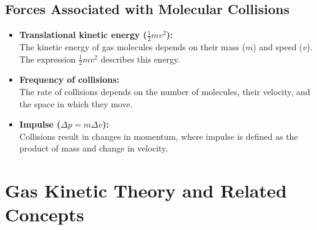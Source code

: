 \documentclass{report}
\begin{document}
\subsection{Forces Associated with Molecular Collisions}
\begin{itemize}
	\item \textbf{Translational kinetic energy ($\frac{1}{2}mv^2$):} \\
	      The kinetic energy of gas molecules depends on their mass ($m$) and speed ($v$). The expression $\frac{1}{2}mv^2$ describes this energy.

	\item \textbf{Frequency of collisions:} \\
	      The rate of collisions depends on the number of molecules, their velocity, and the space in which they move.

	\item \textbf{Impulse ($\Delta p = m \Delta v$):} \\
	      Collisions result in changes in momentum, where impulse is defined as the product of mass and change in velocity.
\end{itemize}

\section{Gas Kinetic Theory and Related Concepts}
\end{document}
